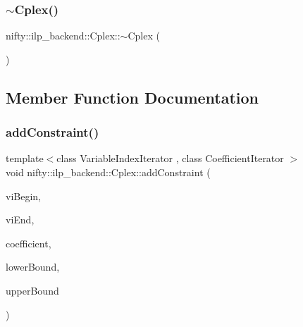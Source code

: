 \subsubsection{\texorpdfstring{$\sim$\+Cplex()}{~Cplex()}}
{\footnotesize\ttfamily nifty\+::ilp\+\_\+backend\+::\+Cplex\+::$\sim$\+Cplex (\begin{DoxyParamCaption}{ }\end{DoxyParamCaption})\hspace{0.3cm}{\ttfamily [inline]}}



\subsection{Member Function Documentation}
\mbox{\label{classnifty_1_1ilp__backend_1_1Cplex_ac1aca9700667959bb0d99c55ffec16ed}} 
\subsubsection{\texorpdfstring{add\+Constraint()}{addConstraint()}}
{\footnotesize\ttfamily template$<$class Variable\+Index\+Iterator , class Coefficient\+Iterator $>$ \\
void nifty\+::ilp\+\_\+backend\+::\+Cplex\+::add\+Constraint (\begin{DoxyParamCaption}\item[{Variable\+Index\+Iterator}]{vi\+Begin,  }\item[{Variable\+Index\+Iterator}]{vi\+End,  }\item[{Coefficient\+Iterator}]{coefficient,  }\item[{const double}]{lower\+Bound,  }\item[{const double}]{upper\+Bound }\end{DoxyParamCaption})\hspace{0.3cm}{\ttfamily [inline]}}

\mbox{\label{classnifty_1_1ilp__backend_1_1Cplex_a38bae82b8a54d28471ceb44514bfba18}} 
